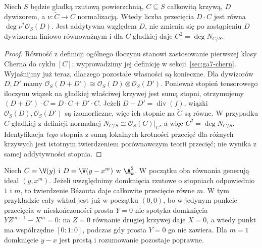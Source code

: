 \begin{stwierdzenie}
\label{st:ga7-divisor-degree}
Niech $S$ będzie gładką rzutową powierzchnią,
$C\subseteq S$ całkowitą krzywą, $D$ dywizorem,
a $\nu:\widetilde C\to C$ normalizacją.
Wtedy liczba przecięcia $D\cdot C$ jest równa
$\deg\nu^*\mathcal O_S(D)$.
Jest addytywna względem $D$, nie zmienia się po
zastąpieniu $D$ dywizorem liniowo równoważnym i
dla $C$ gładkiej daje $C^2=\deg N_{C/S}$.
\end{stwierdzenie}
\begin{proof}
Równość z definicji ogólnego iloczynu stanowi
zastosowanie pierwszej klasy Cherna do cyklu $[C]$;
wyprowadzimy jej definicję w sekcji~\ref{sec:ga7-chern}.
Wyjaśnijmy już teraz, dlaczego pozostałe własności są
konieczne. Dla dywizorów $D,D'$ mamy
$\mathcal O_S(D+D')\cong\mathcal O_S(D)\otimes\mathcal O_S(D')$.
Ponieważ stopień tensorowego iloczynu wiązek na gładkiej
właściwej krzywej jest sumą stopni, otrzymujemy
$(D+D')\cdot C=D\cdot C+D'\cdot C$.
Jeżeli $D-D'=\operatorname{div}(f)$, wiązki
$\mathcal O_S(D),\mathcal O_S(D')$ są izomorficzne,
więc ich stopnie na $\widetilde C$ są równe.
W przypadku $C$ gładkiej z definicji normalnej
$N_{C/S}\cong\mathcal O_S(C)|_C$,
a więc $C^2=\deg N_{C/S}$.
Identyfikacja \emph{tego} stopnia z sumą lokalnych
krotności przecięć dla różnych krzywych jest
istotnym twierdzeniem porównawczym teorii przecięć;
nie wynika z samej addytywności stopnia.
\end{proof}

\begin{przyklad}
Niech $C=\V(y)$ i $D=\V(y-x^m)$ w $\A^2_k$.
W początku oba równania generują ideał $(y,x^m)$.
Jeżeli uwzględnimy domknięcia rzutowe o stopniach
odpowiednio $1$ i $m$, to twierdzenie Bézouta daje
całkowite przecięcie równe $m$. W tym przykładzie
cały wkład jest już w początku $(0,0)$, bo w jedynym
punkcie przecięcia w nieskończoności prosta $Y=0$
nie spotyka domknięcia $YZ^{m-1}-X^m=0$:
na $Z=0$ równanie drugiej krzywej daje $X=0$, a wtedy
punkt ma współrzędne $[0:1:0]$, podczas gdy
prosta $Y=0$ go nie zawiera. Dla $m=1$ domknięcie
$y-x$ jest prostą i rozumowanie pozostaje poprawne.
\end{przyklad}

